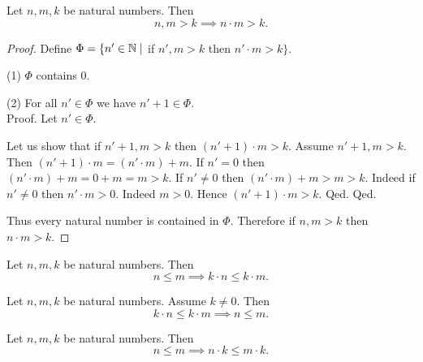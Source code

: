 \documentclass[../arithmetic.tex]{subfiles}
\begin{document}
  \begin{forthel}
    \begin{proposition}
      Let $n, m, k$ be natural numbers.
      Then \[ n, m > k \implies n \cdot m > k. \]
    \end{proposition}
    \begin{proof}
      Define $\Phi = \{ n' \in \mathbb{N} \mid$ if $n', m > k$ then $n' \cdot m > k \}$.

      (1) $\Phi$ contains $0$.

      (2) For all $n' \in \Phi$ we have $n' + 1 \in \Phi$. \\
      Proof.
        Let $n' \in \Phi$.

        Let us show that if $n' + 1, m > k$ then $(n' + 1) \cdot m > k$.
          Assume $n' + 1, m > k$.
          Then $(n' + 1) \cdot m = (n' \cdot m) + m$.
          If $n' = 0$ then
          $(n' \cdot m) + m
            = 0 + m
            = m
            > k$.
          If $n' \neq 0$ then
          $(n' \cdot m) + m
            > m
            > k$.
          Indeed if $n' \neq 0$ then $n' \cdot m > 0$.
          Indeed $m > 0$.
          Hence $(n' + 1) \cdot m > k$.
        Qed.
      Qed.

      Thus every natural number is contained in $\Phi$.
      Therefore if $n, m > k$ then $n \cdot m > k$.
    \end{proof}
  \end{forthel}

  \begin{forthel}
    \begin{corollary}
      Let $n, m, k$ be natural numbers.
      Then \[ n \leq m \implies k \cdot n \leq k \cdot m. \]
    \end{corollary}
  \end{forthel}

  \begin{forthel}
    \begin{corollary}
      Let $n, m, k$ be natural numbers.
      Assume $k \neq 0$.
      Then \[ k \cdot n \leq k \cdot m \implies n \leq m. \]
    \end{corollary}
  \end{forthel}

  \begin{forthel}
    \begin{corollary}
      Let $n, m, k$ be natural numbers.
      Then \[ n \leq m \implies n \cdot k \leq m \cdot k. \]
    \end{corollary}
  \end{forthel}
\end{document}
